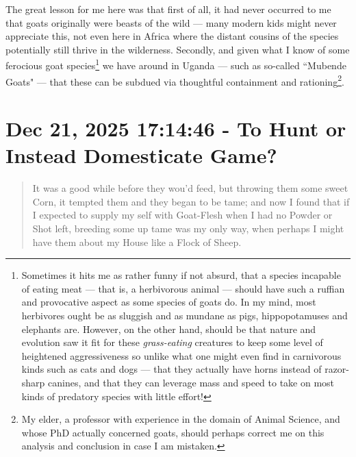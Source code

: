 \documentclass[a4paper]{article}
\begin{document}
The great lesson for me here was that first of all, it had never occurred to me that goats originally were beasts of the wild --- many modern kids might never appreciate this, not even here in Africa where the distant cousins of the species potentially still thrive in the wilderness. Secondly, and given what I know of some ferocious goat species\footnote{Sometimes it hits me as rather funny if not absurd, that a species incapable of eating meat --- that is, a herbivorous animal --- should have such a ruffian and provocative aspect as some species of goats do. In my mind, most herbivores ought be as sluggish and as mundane as pigs, hippopotamuses and elephants are. However, on the other hand, should be that nature and evolution saw it fit for these \textit{grass-eating} creatures to keep some level of heightened aggressiveness so unlike what one might even find in carnivorous kinds such as cats and dogs --- that they actually have horns instead of razor-sharp canines, and that they can leverage mass and speed to take on most kinds of predatory species with little effort!} we have around in Uganda --- such as so-called ``Mubende Goats" --- that these can be subdued via thoughtful containment and rationing\footnote{My elder, a professor with experience in the domain of Animal Science, and whose PhD actually concerned goats, should perhaps correct me on this analysis and conclusion in case I am mistaken.}.





\section{Dec 21, 2025 17:14:46 - To Hunt or Instead Domesticate Game?}
\label{SEC37}



\noindent
\begin{minipage}{1\textwidth}
\vspace{1em}
\begin{quotation}
{\ttfamily

It was a good while before they wou’d feed, but throwing them some sweet Corn, it tempted them and they began to be tame; and now I found that if I expected to supply my self with Goat-Flesh when I had no Powder or Shot left, breeding some up tame was my only way, when perhaps I might have them about my House like a Flock of Sheep.

}
\end{quotation}
\vspace{1em}
\end{minipage}
\end{document}
